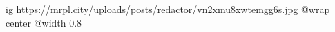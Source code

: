  
 
 
 
 

\ifcmt
  ig https://mrpl.city/uploads/posts/redactor/vn2xmu8xwtemgg6s.jpg
  @wrap center
  @width 0.8
\fi

